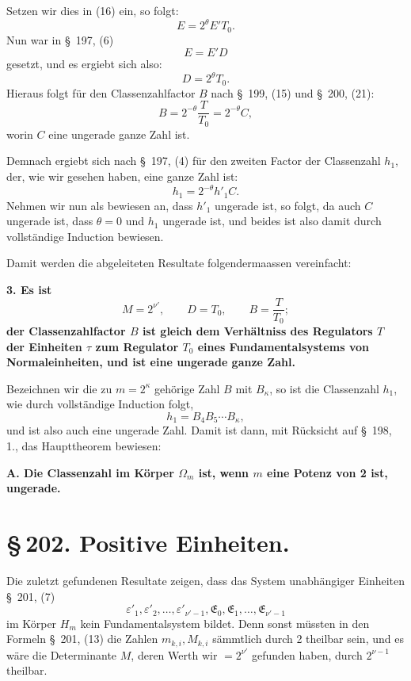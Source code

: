 \documentclass[11pt]{article}
\begin{document}
Setzen wir dies in (16) ein, so folgt:
\[
E=2^\theta E'T_0.
\]
Nun war in \S~197, (6)
\[
E=E'D
\]
gesetzt, und es ergiebt sich also:
\[
D=2^\theta T_0.
\]
Hieraus folgt für den Classenzahlfactor $B$ nach \S~199, (15) und \S~200, (21):
\begin{equation}
B=2^{-\theta}\frac{T}{T_0}=2^{-\theta}C,
\tag{24}
\end{equation}
worin $C$ eine ungerade ganze Zahl ist.

Demnach ergiebt sich nach \S~197, (4) für den zweiten Factor der Classenzahl $h_1$, der, wie wir gesehen haben, eine ganze Zahl ist:
\begin{equation}
h_1=2^{-\theta}h'_1C.
\tag{25}
\end{equation}
Nehmen wir nun als bewiesen an, dass $h'_1$ ungerade ist, so folgt, da auch $C$ ungerade ist, dass $\theta=0$ und $h_1$ ungerade ist, und beides ist also damit durch vollständige Induction bewiesen.

Damit werden die abgeleiteten Resultate folgendermaassen vereinfacht:

\begin{center}\textbf{3. Es ist}
\[
M=2^{\nu'},\qquad D=T_0,
\qquad B=\frac{T}{T_0};
\tag{26}
\]
\textbf{der Classenzahlfactor $B$ ist gleich dem Verhältniss des Regulators $T$ der Einheiten $\tau$ zum Regulator $T_0$ eines Fundamentalsystems von Normaleinheiten, und ist eine ungerade ganze Zahl.}\end{center}

Bezeichnen wir die zu $m=2^\kappa$ gehörige Zahl $B$ mit $B_\kappa$, so ist die Classenzahl $h_1$, wie durch vollständige Induction folgt,
\begin{equation}
h_1=B_4B_5\cdots B_\kappa,
\tag{27}
\end{equation}
und ist also auch eine ungerade Zahl. Damit ist dann, mit Rücksicht auf \S~198, 1., das Haupttheorem bewiesen:

\begin{center}\textbf{A. Die Classenzahl im Körper $\Omega_m$ ist, wenn $m$ eine Potenz von 2 ist, ungerade.}\end{center}

\section*{\S\,202. Positive Einheiten.}

Die zuletzt gefundenen Resultate zeigen, dass das System unabhängiger Einheiten \S~201, (7)
\[
\varepsilon'_1,\varepsilon'_2,\ldots,\varepsilon'_{\nu'-1},\mathfrak E_0,\mathfrak E_1,\ldots,\mathfrak E_{\nu'-1}
\]
im Körper $H_m$ kein Fundamentalsystem bildet. Denn sonst müssten in den Formeln \S~201, (13) die Zahlen $m_{k,i},M_{k,i}$ sämmtlich durch 2 theilbar sein, und es wäre die Determinante $M$, deren Werth wir $=2^{\nu'}$ gefunden haben, durch $2^{\nu-1}$ theilbar.
\end{document}
